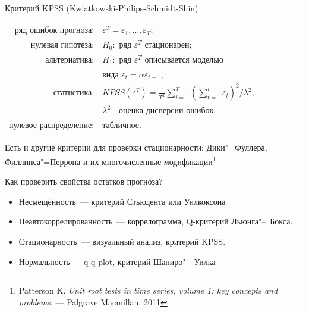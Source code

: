 \documentclass[10pt,pdf,utf8,hyperref={unicode},aspectratio=169]{beamer}
\begin{document}
\begin{frame}{Критерий KPSS (Kwiatkowski-Philips-Schmidt-Shin)}
	\begin{center}
		\begin{tabular}{rl}
			ряд ошибок прогноза:            & $\varepsilon^T = \varepsilon_1,\dots,\varepsilon_T;$ \\
			нулевая гипотеза:               & $H_0\colon$ ряд $\varepsilon^T$ стационарен;\\
			альтернатива:                   & $H_1\colon$ ряд $\varepsilon^T$ описывается моделью \\
			& вида $\varepsilon_t = \alpha\varepsilon_{t-1};$ \\
			статистика:                     & $KPSS\left(\varepsilon^T\right) = \frac1{T^2} \sum\limits_{i=1}^T \left(\sum\limits_{t=1}^i \varepsilon_t\right)^2 \Big/ \lambda^2,$ \\
            &$\lambda^2$---оценка дисперсии ошибок;\\
			нулевое распределение:          & табличное.\\
		\end{tabular}
	\end{center}
	
	\bigskip
	
	Есть и другие критерии для проверки стационарности: Дики"=Фуллера, Филлипса"=Перрона и их многочисленные модификации\footnote{Patterson K.  \textit{Unit root tests in time series, volume 1: key concepts and problems}. --- Palgrave Macmillan, 2011}
\end{frame}


\begin{frame}{Как проверить свойства остатков прогноза?}
		\begin{itemize}
		\item Несмещённость~--- критерий Стьюдента или Уилкоксона
		\item Неавтокоррелированность~--- коррелограмма, Q-критерий Льюнга"--~Бокса.
		\item Стационарность~--- визуальный анализ, критерий KPSS.
		\item Нормальность --- q-q plot, критерий Шапиро"--~Уилка
	\end{itemize}
\end{frame}






\end{document}

